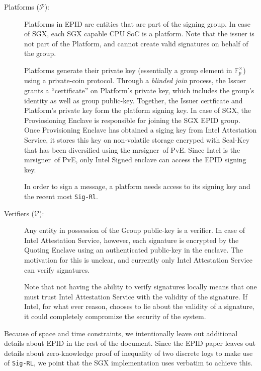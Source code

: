 \documentclass[10pt, letterpaper]{article}
\newcommand{\mrsigner}{\textsf{mrsigner}}
\newcommand{\pve}{\textsf{PvE}}
\begin{document}
\begin{description}
    \item[Platforms ($\mathcal{P}$):] Platforms in EPID are entities
      that are part of the signing group. In case of SGX, each SGX
      capable CPU SoC is a platform. Note that the issuer is not part
      of the Platform, and cannot create valid signatures on behalf of
      the group.

      Platforms generate their private key (essentially a group
      element in $\mathbb{F}_p^{\times}$) using a private-coin
      protocol. Through a \textit{blinded join} process, the Issuer
      grants a ``certificate'' on Platform's private key, which
      includes the group's identity as well as group
      public-key. Together, the Issuer certficate and Platform's
      private key form the platform signing key. In case of SGX, the
      Proviosioning Enclave is responsible for joining the SGX EPID
      group. Once Provisioning Enclave has obtained a siging key from
      Intel Attestation Service, it stores this key on non-volatile
      storage encryped with Seal-Key that has been diversified using
      the \mrsigner\ of \pve. Since Intel is the \mrsigner\ of \pve,
      only Intel Signed enclave can access the EPID signing key.

      In order to sign a message, a platform needs access to its
      signing key and the recent most \texttt{Sig-Rl}.

    \item [Verifiers ($\mathcal{V}$):] Any entity in possession of the
      Group public-key is a verifier. In case of Intel Attestation
      Service, however, each signature is encrypted by the
      \textsf{Quoting Enclave} using an authenticated public-key in
      the enclave. The motivation for this is unclear, and currently
      only Intel Attestation Service can verify signatures.

      Note that not having the ability to verify signatures locally
      means that one must trust Intel Attestation Service with the
      validity of the signature. If Intel, for what ever reason,
      chooses to lie about the validity of a signature, it could
      completely compromize the security of the system.
  \end{description}

  Because of space and time constraints, we intentionally leave out
  additional details about EPID in the rest of the document. Since the
  EPID paper leaves out details about zero-knowledge proof of
  inequality of two discrete logs to make use of \texttt{Sig-RL}, we
  point that the SGX implementation uses \cite[\S6]{ShoupVFE} verbatim
  to achieve this.
\end{document}
